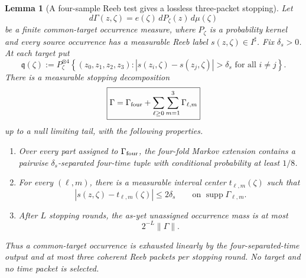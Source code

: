 \documentclass[10pt]{article}
\newtheorem{lemma}[theorem]{Lemma}
\begin{document}
\begin{lemma}[A four-sample Reeb test gives a lossless three-packet stopping]
\label{lem:v081-four-sample-three-packet-stopping}
Let
\[
d\Gamma(z,\zeta)
=
e(\zeta)\,dP_\zeta(z)\,d\mu(\zeta)
\]
be a finite common-target occurrence measure, where \(P_\zeta\) is a probability kernel and every
source occurrence has a measurable Reeb label \(s(z,\zeta)\in I^\sharp\).  Fix
\(\delta_s>0\).  At each target put
\[
\mathfrak q(\zeta)
:=
P_\zeta^{\otimes4}
\left\{
(z_0,z_1,z_2,z_3):
|s(z_i,\zeta)-s(z_j,\zeta)|>\delta_s
\text{ for all }i\ne j
\right\}.
\]
There is a measurable stopping decomposition
\begin{equation}
\label{eq:v081-three-packet-stopping-decomposition}
\boxed{
\Gamma
=
\Gamma_{\rm four}
+
\sum_{\ell\ge0}\sum_{m=1}^3\Gamma_{\ell,m}
}
\end{equation}
up to a null limiting tail, with the following properties.
\begin{enumerate}[label=\textnormal{(\roman*)}]
\item Over every part assigned to \(\Gamma_{\rm four}\), the four-fold Markov extension contains a
pairwise \(\delta_s\)-separated four-time tuple with conditional probability at least \(1/8\).
\item For every \((\ell,m)\), there is a measurable interval center
\(t_{\ell,m}(\zeta)\) such that
\[
|s(z,\zeta)-t_{\ell,m}(\zeta)|\le2\delta_s
\qquad
\text{on }\operatorname{supp}\Gamma_{\ell,m}.
\]
\item After \(L\) stopping rounds, the as-yet unassigned occurrence mass is at most
\[
2^{-L}\|\Gamma\|.
\]
\end{enumerate}
Thus a common-target occurrence is exhausted linearly by the four-separated-time output and at
most three coherent Reeb packets per stopping round.  No target and no time packet is selected.
\end{lemma}
\end{document}
